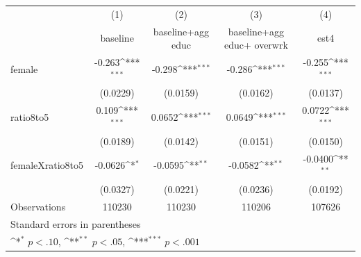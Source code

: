 {
\def\sym#1{\ifmmode^{#1}\else\(^{#1}\)\fi}
\begin{tabular}{l*{4}{c}}
\hline\hline
                    &\multicolumn{1}{c}{(1)}&\multicolumn{1}{c}{(2)}&\multicolumn{1}{c}{(3)}&\multicolumn{1}{c}{(4)}\\
                    &\multicolumn{1}{c}{baseline }&\multicolumn{1}{c}{baseline+agg educ}&\multicolumn{1}{c}{baseline+agg educ+ overwrk}&\multicolumn{1}{c}{est4}\\
\hline
female              &      -0.263\sym{***}&      -0.298\sym{***}&      -0.286\sym{***}&      -0.255\sym{***}\\
                    &    (0.0229)         &    (0.0159)         &    (0.0162)         &    (0.0137)         \\
[1em]
ratio8to5           &       0.109\sym{***}&      0.0652\sym{***}&      0.0649\sym{***}&      0.0722\sym{***}\\
                    &    (0.0189)         &    (0.0142)         &    (0.0151)         &    (0.0150)         \\
[1em]
femaleXratio8to5    &     -0.0626\sym{*}  &     -0.0595\sym{**} &     -0.0582\sym{**} &     -0.0400\sym{**} \\
                    &    (0.0327)         &    (0.0221)         &    (0.0236)         &    (0.0192)         \\
\hline
Observations        &      110230         &      110230         &      110206         &      107626         \\
\hline\hline
\multicolumn{5}{l}{\footnotesize Standard errors in parentheses}\\
\multicolumn{5}{l}{\footnotesize \sym{*} \(p<.10\), \sym{**} \(p<.05\), \sym{***} \(p<.001\)}\\
\end{tabular}
}

